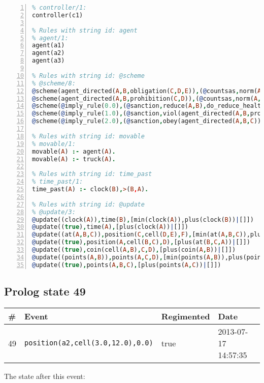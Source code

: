 \documentclass[11pt]{article}\usepackage[utf8]{inputenc}\usepackage{geometry}
\begin{document}
\begin{lstlisting}[language=Prolog, numbers=left]
% Rules with string id: controller
% controller/1:
controller(c1)

% Rules with string id: agent
% agent/1:
agent(a1)
agent(a2)
agent(a3)

% Rules with string id: @scheme
% @scheme/8:
@scheme(agent_directed(A,B,obligation(C,D,E)),(@countsas,norm(A,B,F,obligation(C,D,E)),F),false,(listTrue(C)),(time_past(D)),false,[plus(viol(agent_directed(A,B,obligation(C,D,E))))|[]],[plus(obey(agent_directed(A,B,obligation(C,D,E))))|[]])
@scheme(agent_directed(A,B,prohibition(C,D)),(@countsas,norm(A,B,E,prohibition(C,D)),E),(listTrue(C)),false,(false),false,[plus(viol(agent_directed(A,B,prohibition(C,D))))|[]],[plus(obey(agent_directed(A,B,prohibition(C,D))))|[]])
@scheme(@imply_rule(0.0),(@sanction,reduce(A,B),do_reduce_health(A,B),notifyAgent(A,changed(status))),true,false,false,false,[min(reduce(A,B))|[]],[])
@scheme(@imply_rule(1.0),(@sanction,viol(agent_directed(A,B,prohibition(C,D))),do_sanction(D)),true,false,false,false,[min(viol(agent_directed(A,B,prohibition(C,D))))|[]],[])
@scheme(@imply_rule(2.0),(@sanction,obey(agent_directed(A,B,C))),true,false,false,false,[min(obey(agent_directed(A,B,C)))|[]],[])

% Rules with string id: movable
% movable/1:
movable(A) :- agent(A).
movable(A) :- truck(A).

% Rules with string id: time_past
% time_past/1:
time_past(A) :- clock(B),>(B,A).

% Rules with string id: @update
% @update/3:
@update((clock(A)),time(B),[min(clock(A)),plus(clock(B))|[]])
@update((true),time(A),[plus(clock(A))|[]])
@update((at(A,B,C)),position(C,cell(D,E),F),[min(at(A,B,C)),plus(at(D,E,C))|[]])
@update((true),position(A,cell(B,C),D),[plus(at(B,C,A))|[]])
@update((true),coin(cell(A,B),C,D),[plus(coin(A,B))|[]])
@update((points(A,B)),points(A,C,D),[min(points(A,B)),plus(points(A,D))|[]])
@update((true),points(A,B,C),[plus(points(A,C))|[]])

\end{lstlisting}
\clearpage 
\subsection{Prolog state 49}
\begin{table}[ht]
\centering 
\begin{tabular}{l l l l} 
\textbf{\#} & \textbf{Event} & \textbf{Regimented} & \textbf{Date} \\ [0.5ex] 
\hline
49&\texttt{position(a2,cell(3.0,12.0),0.0)}&true&2013-07-17 14:57:35\\ [1ex] \hline\end{tabular}
\end{table}
The state after this event:
\end{document}
